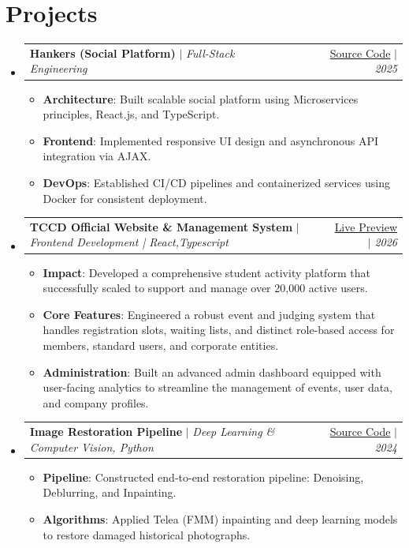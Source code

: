 \documentclass[letterpaper,11pt]{article}
\makeatletter
\newcommand{\resumeItem}[2]{\item\small{\textbf{#1}{: #2 \vspace{-2pt}}}}
\newcommand{\resumeProjectSubheading}[3]{
  \vspace{-1pt}\item
    \begin{tabular*}{0.97\textwidth}{l@{\extracolsep{\fill}}r}
      \textbf{#1} $|$ \textit{\small#2} & #3 \\
    \end{tabular*}\vspace{-5pt}
}
\newcommand{\resumeSubHeadingListStart}{\begin{itemize}[leftmargin=*]}
\newcommand{\resumeSubHeadingListEnd}{\end{itemize}}
\newcommand{\resumeItemListStart}{\begin{itemize}}
\newcommand{\resumeItemListEnd}{\end{itemize}\vspace{-5pt}}
\makeatother
\begin{document}
\section{Projects}
  \resumeSubHeadingListStart
    \resumeProjectSubheading
      {Hankers (Social Platform)}{Full-Stack Engineering}{\href{https://github.com/SWEProject25}{Source Code} $|$ \textit{\small 2025}}
      \resumeItemListStart
        \resumeItem{Architecture}
          {Built scalable social platform using Microservices principles, React.js, and TypeScript.}
        \resumeItem{Frontend}
          {Implemented responsive UI design and asynchronous API integration via AJAX.}
        \resumeItem{DevOps}
          {Established CI/CD pipelines and containerized services using Docker for consistent deployment.}
      \resumeItemListEnd
    \vspace{4pt}
    \resumeProjectSubheading
      {TCCD Official Website \& Management System}{Frontend Development | React,Typescript}{\href{https://tccd.eng.cu.edu.eg/}{Live Preview} $|$ \textit{\small 2026}}
      \resumeItemListStart
        \resumeItem{Impact}
          {Developed a comprehensive student activity platform that successfully scaled to support and manage over 20,000 active users.}
        \resumeItem{Core Features}
          {Engineered a robust event and judging system that handles registration slots, waiting lists, and distinct role-based access for members, standard users, and corporate entities.}
        \resumeItem{Administration}
          {Built an advanced admin dashboard equipped with user-facing analytics to streamline the management of events, user data, and company profiles.}
      \resumeItemListEnd
    \vspace{4pt}
    \resumeProjectSubheading
      {Image Restoration Pipeline}{Deep Learning \& Computer Vision, Python}{\href{https://github.com/ahmedfathy0-0/Image-Colorization-of-Historical-Photos}{Source Code} $|$ \textit{\small 2024}}
      \resumeItemListStart
        \resumeItem{Pipeline}
          {Constructed end-to-end restoration pipeline: Denoising, Deblurring, and Inpainting.}
        \resumeItem{Algorithms}
          {Applied Telea (FMM) inpainting and deep learning models to restore damaged historical photographs.}
      \resumeItemListEnd
  \resumeSubHeadingListEnd
\end{document}
